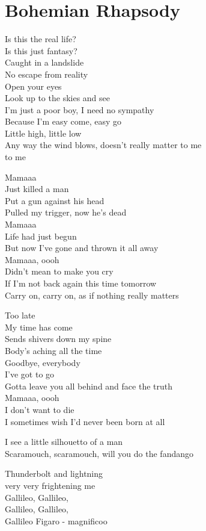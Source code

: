 \section{Bohemian Rhapsody}
Is this the real life?\\
Is this just fantasy?\\
Caught in a landslide\\
No escape from reality\\
Open your eyes\\
Look up to the skies and see\\
I'm just a poor boy, I need no sympathy\\
Because I'm easy come, easy go\\
Little high, little low\\
Any way the wind blows, doesn't really matter to me\\
to me

Mamaaa\\
Just killed a man\\
Put a gun against his head\\
Pulled my trigger, now he's dead\\
Mamaaa\\
Life had just begun\\
But now I've gone and thrown it all away\\
Mamaaa, oooh\\
Didn't mean to make you cry\\
If I'm not back again this time tomorrow\\
Carry on, carry on, as if nothing really matters

Too late\\
My time has come\\
Sends shivers down my spine\\
Body's aching all the time\\
Goodbye, everybody\\
I've got to go\\
Gotta leave you all behind and face the truth\\
Mamaaa, oooh\\
I don't want to die\\
I sometimes wish I'd never been born at all

I see a little silhouetto of a man\\
Scaramouch, scaramouch, will you do the fandango

Thunderbolt and lightning\\
very very frightening me\\
Gallileo, Gallileo,\\
Gallileo, Gallileo,\\
Gallileo Figaro - magnificoo


